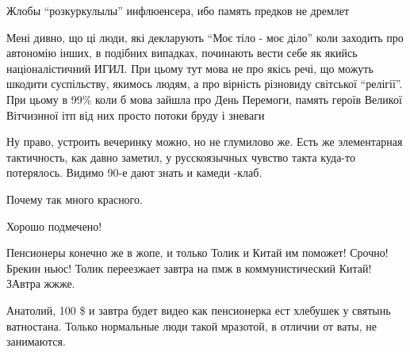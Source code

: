 \begin{itemize}
Жлобы \enquote{розкуркулылы} инфлюенсера, ибо память предков не дремлет


Мені дивно, що ці люди, які декларують \enquote{Моє тіло - моє діло} коли заходить про
автономію інших, в подібних випадках, починають вести себе як якийсь
націоналістичний ИГИЛ. При цьому тут мова не про якісь речі, що можуть шкодити
суспільству, якимось людям, а про вірність різновиду світської \enquote{релігії}. При
цьому в 99\% коли б мова зайшла про День Перемоги, память героїв Великої
Вітчизнної ітп від них просто потоки бруду і зневаги


Ну право, устроить вечеринку можно, но не глумилово же. Есть же элементарная
тактичность, как давно заметил, у русскоязычных чувство такта куда-то
потерялось. Видимо 90-е дают знать и камеди -клаб.

Почему так много красного.

Хорошо подмечено!


Пенсионеры конечно же в жопе, и только Толик и Китай им поможет! Срочно! Брекин
ньюс! Толик переезжает завтра на пмж в коммунистический Китай! ЗАвтра жжже.

Анатолий, 100 \$ и завтра будет видео как пенсионерка ест хлебушек у святынь
ватностана. Только нормальные люди такой мразотой, в отличии от ваты, не
занимаются.

\end{itemize} %
